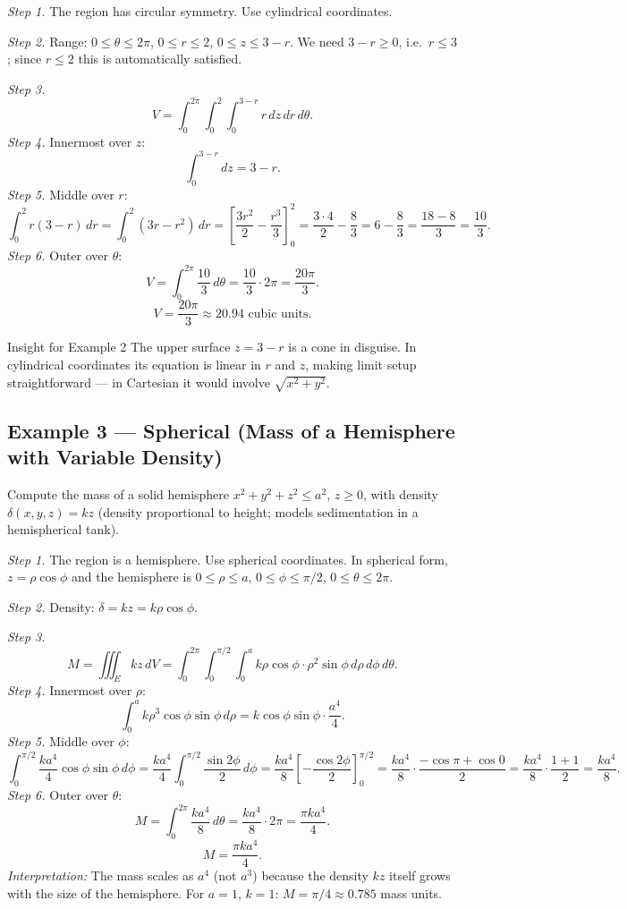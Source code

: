 \documentclass[12pt,a4paper]{article}
\begin{document}
\textit{Step 1.}  The region has circular symmetry. Use cylindrical coordinates.

\textit{Step 2.}  Range: $0 \leq \theta \leq 2\pi$, $0 \leq r \leq 2$, $0 \leq z \leq 3-r$.
We need $3-r \geq 0$, i.e.\ $r \leq 3$; since $r \leq 2$ this is automatically satisfied.

\textit{Step 3.}
\[
  V = \int_0^{2\pi}\int_0^2\int_0^{3-r} r\,dz\,dr\,d\theta.
\]
\textit{Step 4.}  Innermost over $z$:
\[
  \int_0^{3-r} dz = 3 - r.
\]
\textit{Step 5.}  Middle over $r$:
\[
  \int_0^2 r(3-r)\,dr = \int_0^2(3r - r^2)\,dr
  = \left[\frac{3r^2}{2} - \frac{r^3}{3}\right]_0^2
  = \frac{3 \cdot 4}{2} - \frac{8}{3}
  = 6 - \frac{8}{3}
  = \frac{18-8}{3} = \frac{10}{3}.
\]
\textit{Step 6.}  Outer over $\theta$:
\[
  V = \int_0^{2\pi}\frac{10}{3}\,d\theta = \frac{10}{3} \cdot 2\pi = \frac{20\pi}{3}.
\]
\[
  \boxed{V = \frac{20\pi}{3} \approx 20.94 \text{ cubic units.}}
\]

\begin{learnbox}{Insight for Example 2}
The upper surface $z = 3-r$ is a cone in disguise. In cylindrical coordinates its equation is linear
in $r$ and $z$, making limit setup straightforward --- in Cartesian it would involve $\sqrt{x^2+y^2}$.
\end{learnbox}

\subsection*{Example 3 --- Spherical (Mass of a Hemisphere with Variable Density)}

Compute the mass of a solid hemisphere $x^2+y^2+z^2 \leq a^2$, $z \geq 0$, with density
$\delta(x,y,z) = k z$ (density proportional to height; models sedimentation in a hemispherical tank).

\textit{Step 1.}  The region is a hemisphere. Use spherical coordinates. In spherical form,
$z = \rho\cos\phi$ and the hemisphere is $0 \leq \rho \leq a$, $0 \leq \phi \leq \pi/2$,
$0 \leq \theta \leq 2\pi$.

\textit{Step 2.}  Density: $\delta = kz = k\rho\cos\phi$.

\textit{Step 3.}
\[
  M = \iiint_E kz\,dV
    = \int_0^{2\pi}\int_0^{\pi/2}\int_0^a
        k\rho\cos\phi \cdot \rho^2\sin\phi\,d\rho\,d\phi\,d\theta.
\]
\textit{Step 4.}  Innermost over $\rho$:
\[
  \int_0^a k\rho^3\cos\phi\sin\phi\,d\rho
  = k\cos\phi\sin\phi \cdot \frac{a^4}{4}.
\]
\textit{Step 5.}  Middle over $\phi$:
\[
  \int_0^{\pi/2}\frac{k a^4}{4}\cos\phi\sin\phi\,d\phi
  = \frac{k a^4}{4}\int_0^{\pi/2}\frac{\sin 2\phi}{2}\,d\phi
  = \frac{k a^4}{8}\left[-\frac{\cos 2\phi}{2}\right]_0^{\pi/2}
  = \frac{k a^4}{8}\cdot\frac{-\cos\pi + \cos 0}{2}
  = \frac{k a^4}{8}\cdot\frac{1+1}{2}
  = \frac{k a^4}{8}.
\]
\textit{Step 6.}  Outer over $\theta$:
\[
  M = \int_0^{2\pi}\frac{k a^4}{8}\,d\theta = \frac{k a^4}{8}\cdot 2\pi = \frac{\pi k a^4}{4}.
\]
\[
  \boxed{M = \frac{\pi k a^4}{4}.}
\]
\textit{Interpretation:} The mass scales as $a^4$ (not $a^3$) because the density $kz$ itself grows
with the size of the hemisphere. For $a = 1$, $k = 1$: $M = \pi/4 \approx 0.785$ mass units.
\end{document}
